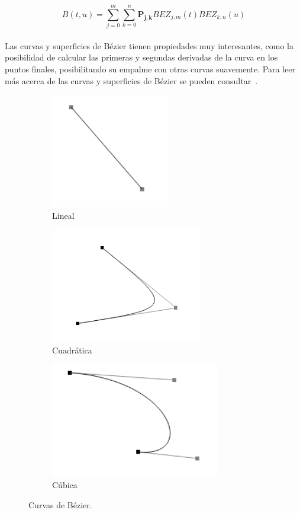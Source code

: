 \begin{equation}
B(t, u) =
\sum_{j=0}^{m}{\sum_{k=0}^{n}{\mathbf{P_{j,k}}BEZ_{j,m}(t)BEZ_{k,n}(u)}}
\label{eq:6}
\end{equation}\\

Las curvas y superficies de Bézier tienen propiedades muy interesantes, como la
posibilidad de calcular las primeras y segundas derivadas de la curva en los
puntos finales, posibilitando su empalme con otras curvas suavemente. Para leer
más acerca de las curvas y superficies de Bézier se pueden
consultar~\citet{HEARN,Bailey}.

\begin{figure}[t]
		\centering
	\begin{subfigure}[b]{.3\textwidth}
			\includegraphics[height=5cm,width=\textwidth]{figures/bezier1.png}
			\caption{Lineal}
			\label{fig:bezier1}
	\end{subfigure}
	\begin{subfigure}[b]{.3\textwidth}
			\includegraphics[height=5cm,width=\textwidth]{figures/bezier2.png}
			\caption{Cuadrática}
			\label{fig:bezier2}
	\end{subfigure}
	\begin{subfigure}[b]{.3\textwidth}
			\includegraphics[height=5cm,width=\textwidth]{figures/bezier3.png}
			\caption{Cúbica}
			\label{fig:bezier3}
	\end{subfigure}
	\caption{Curvas de Bézier.}
	\label{fig:bezier}
\end{figure}

